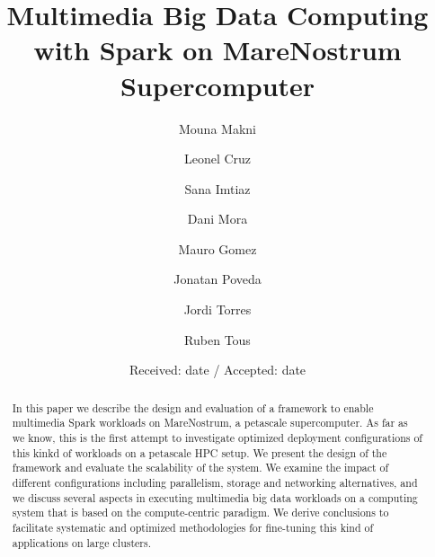 \documentclass[smallextended]{svjour3}       %
\begin{document}
\title{Multimedia Big Data Computing with Spark on MareNostrum Supercomputer}


\author{Mouna Makni \and
        Leonel Cruz \and
        Sana Imtiaz \and
        Dani Mora \and
        Mauro Gomez \and
        Jonatan Poveda \and
        Jordi Torres \and
        Ruben Tous 
}



\date{Received: date / Accepted: date}


\maketitle

\begin{abstract}
In this paper we describe the design and evaluation of a framework to enable multimedia Spark workloads on MareNostrum, a petascale supercomputer. As far as we know, this is the first attempt to investigate optimized deployment configurations of this kinkd of workloads on a petascale HPC setup. We present the design of the framework and evaluate the scalability of the system. We examine the impact of different configurations including parallelism, storage and networking alternatives, and we discuss several aspects in executing multimedia big data workloads on a computing system that is based on the compute-centric paradigm. We derive conclusions to facilitate systematic and optimized methodologies for fine-tuning this kind of applications on large clusters.


\end{abstract}
\end{document}
